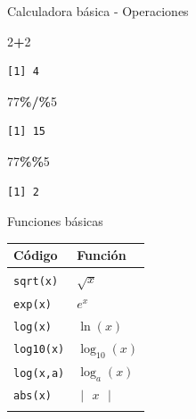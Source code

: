 \documentclass[
  ignorenonframetext,
  aspectratio=169]{beamer}
\newenvironment{Shaded}{\begin{snugshade}}{\end{snugshade}}
\newcommand{\DecValTok}[1]{\textcolor[rgb]{0.00,0.00,0.81}{#1}}
\newcommand{\SpecialCharTok}[1]{\textcolor[rgb]{0.81,0.36,0.00}{\textbf{#1}}}
\begin{document}
\begin{frame}[fragile]{Calculadora básica - Operaciones}
\label{calculadora-buxe1sica---operaciones-1}
\begin{Shaded}
\begin{Highlighting}[]
\DecValTok{2}\SpecialCharTok{+}\DecValTok{2}
\end{Highlighting}
\end{Shaded}

\begin{verbatim}
[1] 4
\end{verbatim}

\begin{Shaded}
\begin{Highlighting}[]
\DecValTok{77}\SpecialCharTok{\%/\%}\DecValTok{5}
\end{Highlighting}
\end{Shaded}

\begin{verbatim}
[1] 15
\end{verbatim}

\begin{Shaded}
\begin{Highlighting}[]
\DecValTok{77}\SpecialCharTok{\%\%}\DecValTok{5}
\end{Highlighting}
\end{Shaded}

\begin{verbatim}
[1] 2
\end{verbatim}
\end{frame}

\begin{frame}[fragile]{Funciones básicas}
\label{funciones-buxe1sicas}
\begin{longtable}[]{@{}ll@{}}
\toprule\noalign{}
Código & Función \\
\midrule\noalign{}
\endhead
\texttt{sqrt(x)} & \(\sqrt{x}\) \\
\texttt{exp(x)} & \(e^x\) \\
\texttt{log(x)} & \(\ln(x)\) \\
\texttt{log10(x)} & \(\log_{10}(x)\) \\
\texttt{log(x,a)} & \(\log_a(x)\) \\
\texttt{abs(x)} & \(\begin{vmatrix}x\end{vmatrix}\) \\
\bottomrule\noalign{}
\end{longtable}
\end{frame}
\end{document}
